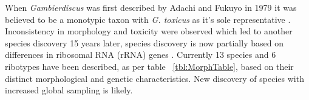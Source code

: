 \documentclass[12pt]{article}
\begin{document}
When \emph{Gambierdiscus} was first described by Adachi and Fukuyo in 1979 it was believed to be a monotypic taxon with \emph{G. toxicus} as it's sole representative \cite{adachi1979thecal}. Inconsistency in morphology and toxicity were observed which led to another species discovery 15 years later, species discovery is now partially based on differences in ribosomal RNA (rRNA) genes \cite{faust1995observation,holmes1990toxicity,holmes1991strain,chinain1997intraspecific,richlen2008phylogeography,bomber1988epiphytic,bomber1989epiphytism,bomber1989genitic,morton1993response}. Currently 13 species and 6 ribotypes have been described, as per table ~\ref{tbl:MorphTable}, based on their distinct morphological and genetic characteristics. New discovery of species with increased global sampling is likely. \\
\end{document}
